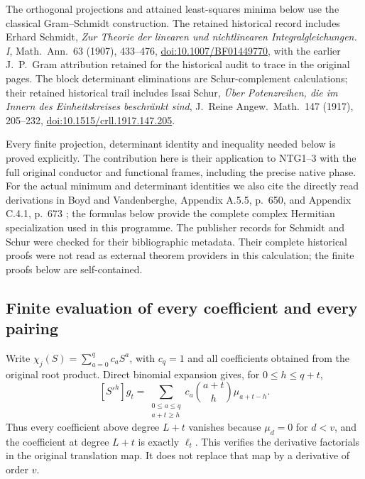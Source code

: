\documentclass[11pt,a4paper]{article}
\begin{document}
\begingroup\raggedright
The orthogonal projections and attained least-squares minima below
use the classical Gram--Schmidt construction. The retained historical
record includes Erhard Schmidt, \emph{Zur Theorie der linearen und
nichtlinearen Integralgleichungen. I}, Math.\ Ann.\ 63 (1907),
433--476,
\href{https://doi.org/10.1007/BF01449770}{doi:10.1007/BF01449770},
with the earlier J.\ P.\ Gram attribution retained for the historical
audit to trace in the original pages. The block determinant eliminations
are Schur-complement calculations; their retained historical trail includes
Issai Schur,
\emph{\"Uber Potenzreihen, die im Innern des Einheitskreises
beschr\"ankt sind}, J.\ Reine Angew.\ Math.\ 147 (1917), 205--232,
\href{https://doi.org/10.1515/crll.1917.147.205}
{doi:10.1515/crll.1917.147.205}.
\par\endgroup
Every finite projection, determinant identity and inequality
needed below is proved explicitly. The contribution here is their
application to NTG1--3 with the full original conductor and
functional frames, including the precise native phase.
For the actual minimum and determinant identities we also cite the
directly read derivations in Boyd and Vandenberghe,
Appendix A.5.5, p.~650, and Appendix C.4.1, p.~673
\cite{human:boyd-vandenberghe}; the formulas below provide the
complete complex Hermitian specialization used in this programme.
The publisher records for Schmidt and Schur were checked for
their bibliographic metadata. Their complete historical proofs
were not read as external theorem providers in this calculation;
the finite proofs below are self-contained.

\subsection{Finite evaluation of every coefficient and every pairing}
Write $\chi_j(S)=\sum_{a=0}^{q}c_aS^a$, with $c_q=1$ and all
coefficients obtained from the original root product. Direct
binomial expansion gives, for $0\le h\le q+t$,
\[
 [S'^h]g_t
   =\sum_{\substack{0\le a\le q\\a+t\ge h}}
             c_a\binom{a+t}{h}\mu_{a+t-h}.
                                                               \tag{NTG4}
\]
Thus every coefficient above degree $L+t$ vanishes because
$\mu_d=0$ for $d<v$, and the coefficient at degree $L+t$ is
exactly $\ell_t$. This verifies the derivative factorials in
the original translation map. It does not replace that map
by a derivative of order $v$.
\end{document}
